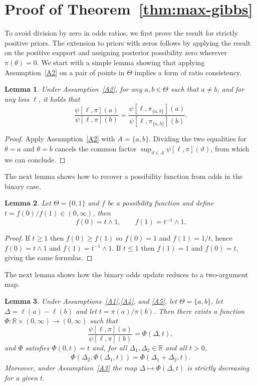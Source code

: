 \documentclass[accepted]{uai2026} %
\newtheorem{lemma}{Lemma}
\theoremstyle{remark}
\begin{document}
\section{Proof of Theorem~\ref{thm:max-gibbs}}
\label{sec:proof:max-gibbs}

To avoid division by zero in odds ratios, we first prove the result for strictly positive priors. The extension to priors with zeros follows by applying the result on the positive support and assigning posterior possibility zero wherever $\pi(\theta)=0$. We start with a simple lemma showing that applying Assumption~\ref{A2} on a pair of points in $\Theta$ implies a form of ratio consistency.

\begin{lemma}
\label{lem:pairwise-restrict}
Under Assumption~\ref{A2}, for any $a,b \in \Theta$ such that $a \neq b$, and for any loss $\ell$, it holds that
\[
\frac{\psi[\ell,\pi](a)}{\psi[\ell,\pi](b)} = \frac{\psi[\ell, \pi_{\{a,b\}}](a)}{\psi[\ell, \pi_{\{a,b\}}](b)}.
\]
\end{lemma}

\begin{proof}
Apply Assumption~\ref{A2} with $A=\{a,b\}$. Dividing the two equalities for $\theta = a$ and $\theta = b$ cancels the common factor
$\sup_{\vartheta \in A}\psi[\ell,\pi](\vartheta)$, from which we can conclude.
\end{proof}

The next lemma shows how to recover a possibility function from odds in the binary case.

\begin{lemma}
\label{lem:binary-odds}
Let $\Theta = \{0,1\}$ and $f$ be a possibility function and define $t=f(0)/f(1)\in(0,\infty)$, then
\[
f(0)=t\land 1,\qquad f(1)=t^{-1}\land 1.
\]
\end{lemma}

\begin{proof}
If $t\ge 1$ then $f(0)\ge f(1)$ so $f(0)=1$ and $f(1)=1/t$, hence $f(0)=t\land 1$ and $f(1)=t^{-1}\land 1$.
If $t\le 1$ then $f(1)=1$ and $f(0)=t$, giving the same formulas.
\end{proof}

The next lemma shows how the binary odds update reduces to a two-argument map.

\begin{lemma}
\label{lem:phi-exists}
Under Assumptions~\ref{A1},\ref{A4}, and \ref{A5}, let $\Theta=\{a,b\}$, let $\Delta = \ell(a)-\ell(b)$ and let $t = \pi(a)/\pi(b)$. Then there exists a function $\Phi : \mathbb{R}\times(0,\infty) \to (0,\infty)$ such that
\[
\frac{\psi[\ell,\pi](a)}{\psi[\ell,\pi](b)} = \Phi(\Delta,t),
\]
and $\Phi$ satisfies $\Phi(0,t) = t$ and, for all $\Delta_1, \Delta_2 \in \mathbb{R}$ and all $t > 0$,
\begin{align*}
\Phi(\Delta_2,\Phi(\Delta_1,t)) = \Phi(\Delta_1+\Delta_2,t).
\end{align*}
Moreover, under Assumption~\ref{A3} the map $\Delta \mapsto \Phi(\Delta,t)$ is strictly decreasing for a given $t$.
\end{lemma}
\end{document}
